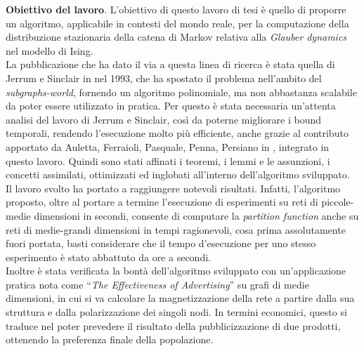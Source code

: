 \textbf{Obiettivo del lavoro}. L’obiettivo di questo lavoro di tesi è quello di proporre un algoritmo, applicabile in contesti del mondo reale, per la computazione della distribuzione stazionaria della catena di Markov relativa alla \textit{Glauber dynamics} nel modello di Ising.\\ La pubblicazione che ha dato il via a questa linea di ricerca è stata quella di Jerrum e Sinclair in \cite{jerrum1993polynomial} nel 1993, che ha spostato il problema nell'ambito del \textit{subgraphs-world}, fornendo un algoritmo polinomiale, ma non abbastanza scalabile da poter essere utilizzato in pratica. Per questo è stata necessaria un'attenta analisi del lavoro di Jerrum e Sinclair, così da poterne migliorare i bound temporali, rendendo l'esecuzione molto più efficiente, anche grazie al contributo apportato da Auletta, Ferraioli, Pasquale, Penna, Persiano in \cite{auletta2011convergence}, integrato in questo lavoro. Quindi sono stati affinati i teoremi, i lemmi e le assunzioni, i concetti assimilati, ottimizzati ed inglobati all'interno dell'algoritmo sviluppato.\\
Il lavoro svolto ha portato a raggiungere notevoli risultati. Infatti, l'algoritmo proposto, oltre al portare a termine l'esecuzione di esperimenti su reti di piccole-medie dimensioni in secondi, consente di computare la \textit{partition function} anche su reti di medie-grandi dimensioni in tempi ragionevoli, cosa prima assolutamente fuori portata, basti considerare che il tempo d'esecuzione per uno stesso esperimento è stato abbattuto da ore a secondi.\\
Inoltre è stata verificata la bontà dell'algoritmo sviluppato con un'applicazione pratica nota come ``\textit{The Effectiveness of Advertising}'' su grafi di medie dimensioni, in cui si va calcolare la magnetizzazione della rete a partire dalla sua struttura e dalla polarizzazione dei singoli nodi. In termini economici, questo si traduce nel poter prevedere il risultato della pubblicizzazione di due prodotti, ottenendo la preferenza finale della popolazione.\\

